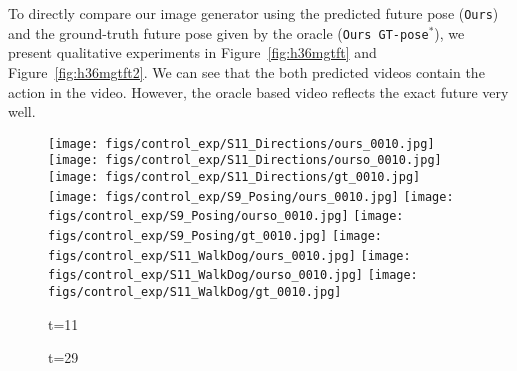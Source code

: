 \documentclass{article}
\begin{document}
\begin{appendix}
\clearpage
To directly compare our image generator using the predicted future pose (\texttt{Ours}) and the ground-truth future pose given by the oracle (\texttt{Ours GT-pose$^*$}), we present qualitative experiments in Figure~\ref{fig:h36mgtft} and Figure~\ref{fig:h36mgtft2}.
We can see that the both predicted videos contain the action in the video. However, the oracle based video reflects the exact future very well.

\begin{figure*}[!thbp]
    \centering
    \vspace{20pt}
	\begin{subfigure}{0.04\linewidth}
        \raggedleft
    \end{subfigure}
    \begin{subfigure}{0.12\linewidth}
        \caption*{t=11}
        \vspace{-7pt}
	    \texttt{[image: figs/control\_exp/S11\_Directions/ours\_0010.jpg]}
	    \texttt{[image: figs/control\_exp/S11\_Directions/ourso\_0010.jpg]}
	    \vspace{.2cm}
  		\texttt{[image: figs/control\_exp/S11\_Directions/gt\_0010.jpg]}
  		\texttt{[image: figs/control\_exp/S9\_Posing/ours\_0010.jpg]}
  		\texttt{[image: figs/control\_exp/S9\_Posing/ourso\_0010.jpg]}
  		\vspace{.2cm}
  		\texttt{[image: figs/control\_exp/S9\_Posing/gt\_0010.jpg]}
  		\texttt{[image: figs/control\_exp/S11\_WalkDog/ours\_0010.jpg]}
  		\texttt{[image: figs/control\_exp/S11\_WalkDog/ourso\_0010.jpg]}
  		\vspace{.2cm}
  		\texttt{[image: figs/control\_exp/S11\_WalkDog/gt\_0010.jpg]}
	\end{subfigure} 
    \begin{subfigure}{0.12\linewidth}
        \caption*{t=29}
        \vspace{-7pt}

\end{subfigure}
\end{figure*}
\end{appendix}
\end{document}
